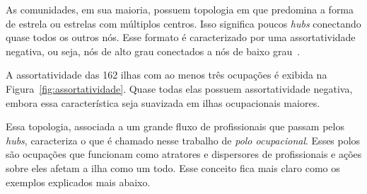 \documentclass[
  article,
  11pt,
  a4paper,
  english,
  brazil,
  sumario=tradicional]{abntex2}
\begin{document}

As comunidades, em sua maioria, possuem topologia em que predomina a forma de estrela ou estrelas com múltiplos centros. Isso significa poucos \textit{hubs} conectando quase todos os outros nós. Esse formato é caracterizado por uma assortatividade negativa, ou seja, nós de alto grau conectados a nós de baixo grau~\cite{Barabasi2016-rn}.

A assortatividade das 162 ilhas com ao menos três ocupações é exibida na Figura~\ref{fig:assortatividade}. Quase todas elas possuem assortatividade negativa, embora essa característica seja suavizada em ilhas ocupacionais maiores.

Essa topologia, associada a um grande fluxo de profissionais que passam pelos \textit{hubs}, caracteriza o que é chamado nesse trabalho de \textit{polo ocupacional}. Esses polos são ocupações que funcionam como atratores e dispersores de profissionais e ações sobre eles afetam a ilha como um todo. Esse conceito fica mais claro como os exemplos explicados mais abaixo.
\end{document}
